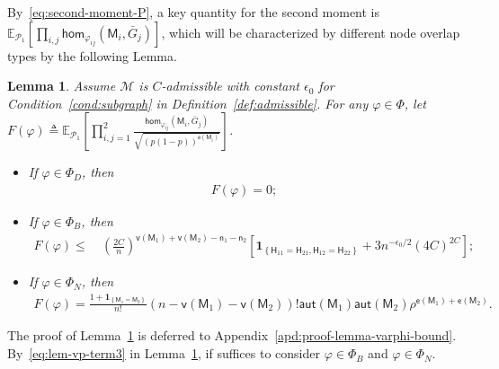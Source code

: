 \documentclass[letterpaper,11pt]{article}
\newtheorem{lemma}{Lemma}
\theoremstyle{definition}
\newcommand{\maM}{\mathcal{M}}
\newcommand{\maP}{\mathcal{P}}
\newcommand{\nbr}[1]{{\sf\color{red}[#1]}}
\newcommand{\en}{\mathsf{{e}}}
\newcommand{\vn}{\mathsf{{v}}}
\newcommand{\pth}[1]{\left( #1 \right)}
\newcommand{\qth}[1]{\left[ #1 \right]}
\newcommand{\sfH}{{\mathsf{H}}}
\newcommand{\sfM}{{\mathsf{M}}}
\newcommand{\sfn}{{\mathsf{n}}}
\newcommand{\indc}[1]{{\mathbf{1}_{\left\{{#1}\right\}}}}
\newcommand{\aut}{\mathsf{aut}}
\renewcommand{\hom}{\mathsf{hom}}
\newcommand{\vp}{\varphi}
\def\E{\mathbb{E}}
\begin{document}
By~\eqref{eq:second-moment-P}, a key quantity for the second moment is $\E_{\maP_1}\qth{\prod_{i,j}\hom_{\vp_{ij}}(\sfM_i,\bar{G}_j)}$, which will be characterized by different node overlap types by the following Lemma.

\begin{lemma}\label{lem:varphi-bound}
Assume $\maM$ is \emph{$C$-admissible} with constant $\epsilon_0$ for Condition~\ref{cond:subgraph} in Definition~\ref{def:admissible}. For any $\vp\in \Phi$, let $F(\vp)\triangleq \E_{\maP_1}\qth{\prod_{i,j=1}^2\frac{\hom_{\vp_{ij}}(\sfM_i,\bar{G}_j)}{\sqrt{(p(1-p))^{\en(\sfM_i)}}}}$.
\begin{itemize}
    \item If $\vp\in \Phi_D$, then   
    \begin{align}\label{eq:lem-vp-term3}
    F(\vp) = 0;
    \end{align}
    \item If $\vp\in \Phi_B$, then 
    \begin{align}\label{eq:lem-vp-term2}
     F(\vp)\le&~ \pth{\frac{2C}{n}}^{\vn(\sfM_1)+\vn(\sfM_2)-\sfn_1-\sfn_2}\qth{\indc{\sfH_{11}=\sfH_{21},\sfH_{12} = \sfH_{22}}+3n^{-\epsilon_0/2}\pth{4C}^{2C}};
    \end{align}
    \item  If $\vp\in \Phi_N$, then %
\begin{align}\label{eq:lem-vp-term1}
    F(\vp)
= \frac{1+\indc{\sfM_1= \sfM_2}}{n!}(n-\vn(\sfM_1)-\vn(\sfM_2))!\aut(\sfM_1)\aut(\sfM_2)\rho^{\en(\sfM_1)+\en(\sfM_2)}.
    \end{align}
\end{itemize}
\end{lemma}
The proof of Lemma~\ref{lem:varphi-bound} is deferred to Appendix~\ref{apd:proof-lemma-varphi-bound}. By~\eqref{eq:lem-vp-term3} in Lemma~\ref{lem:varphi-bound}, if suffices to consider $\vp \in \Phi_B$ and $\vp\in \Phi_N$.
\end{document}
